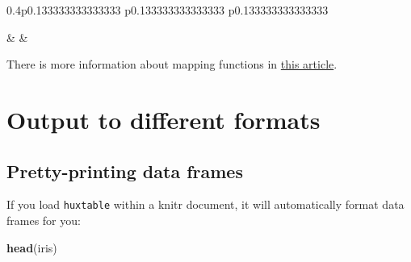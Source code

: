 \documentclass[]{article}
\newenvironment{Shaded}{\begin{snugshade}}{\end{snugshade}}
\newcommand{\KeywordTok}[1]{\textcolor[rgb]{0.13,0.29,0.53}{\textbf{#1}}}
\newcommand{\NormalTok}[1]{#1}
\begin{document}
\begin{table}[ht]
\begin{centerbox}
\begin{threeparttable}
\begin{tabularx}{0.4\textwidth}{p{} p{} p{}}
\hhline{}

 &
 &
 \tabularnewline[-0.5pt]


\hhline{}
\end{tabularx}
\end{threeparttable}\par\end{centerbox}

\end{table}
 

\FloatBarrier

There is more information about mapping functions in
\href{https://hughjonesd.github.io/reporting-data-with-huxtable-4.3.0.html}{this
article}.

\hypertarget{output-to-different-formats}{%
\section{Output to different
formats}\label{output-to-different-formats}}

\hypertarget{pretty-printing-data-frames}{%
\subsection{Pretty-printing data
frames}\label{pretty-printing-data-frames}}

If you load \texttt{huxtable} within a knitr document, it will
automatically format data frames for you:

\begin{Shaded}
\begin{Highlighting}[]
\KeywordTok{head}\NormalTok{(iris)}
\end{Highlighting}
\end{Shaded}

 
  \providecommand{\huxb}[2]{\arrayrulecolor[RGB]{#1}\global\arrayrulewidth=#2pt}
  \providecommand{\huxvb}[2]{\color[RGB]{#1}\vrule width #2pt}
  \providecommand{\huxtpad}[1]{\rule{0pt}{#1}}
  \providecommand{\huxbpad}[1]{\rule[-#1]{0pt}{#1}}
\end{document}
